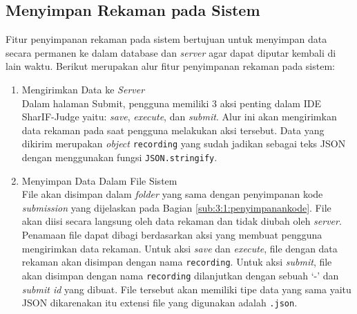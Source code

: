 \subsection{Menyimpan Rekaman pada Sistem}
\label{sub:5:2:storerekaman}

Fitur penyimpanan rekaman pada sistem bertujuan untuk menyimpan data secara permanen ke dalam database dan \textit{server} agar dapat diputar kembali di lain waktu. Berikut merupakan alur fitur penyimpanan rekaman pada sistem:

\begin{enumerate}
    \item Mengirimkan Data ke \textit{Server} \\
    Dalam halaman Submit, pengguna memiliki 3 aksi penting dalam IDE SharIF-Judge yaitu: \textit{save}, \textit{execute}, dan \textit{submit}. Alur ini akan mengirimkan data rekaman pada saat pengguna melakukan aksi tersebut. Data yang dikirim merupakan \textit{object} \verb|recording| yang sudah jadikan sebagai teks JSON dengan menggunakan fungsi \verb|JSON.stringify|.

    \item Menyimpan Data Dalam File Sistem \\
    File akan disimpan dalam \textit{folder} yang sama dengan penyimpanan kode \textit{submission} yang dijelaskan pada Bagian \ref{sub:3:1:penyimpanankode}. File akan diisi secara langsung oleh data rekaman dan tidak diubah oleh \textit{server}. Penamaan file dapat dibagi berdasarkan aksi yang membuat pengguna mengirimkan data rekaman. Untuk aksi \textit{save} dan \textit{execute}, file dengan data rekaman akan disimpan dengan nama \verb|recording|. Untuk aksi \textit{submit}, file akan disimpan dengan nama \verb|recording| dilanjutkan dengan sebuah `-' dan \textit{submit id} yang dibuat. File tersebut akan memiliki tipe data yang sama yaitu JSON dikarenakan itu extensi file yang digunakan adalah \verb|.json|.
 

\end{enumerate}
